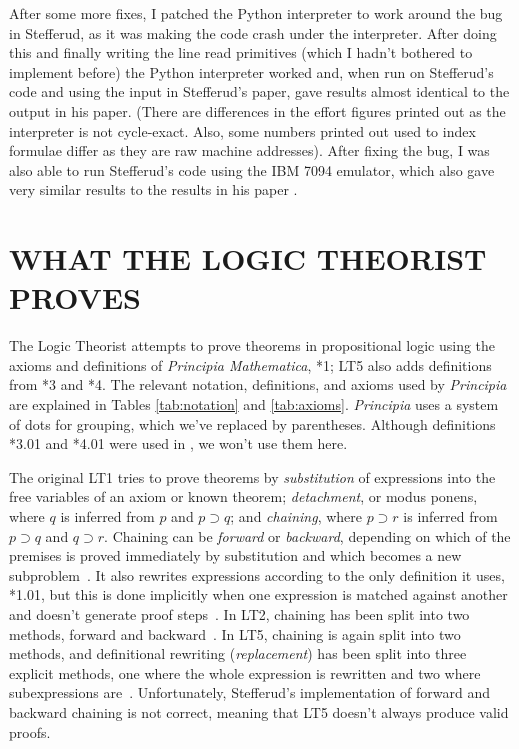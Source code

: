 \documentclass{IEEEcsmag}
\begin{document}
After some more fixes, I patched the Python interpreter to work
around the bug in Stefferud, as it was making the code crash under the
interpreter.  After doing this and finally writing the line read primitives
(which I hadn't bothered to implement before) the Python interpreter
worked and, when run on Stefferud's code and using the input in Stefferud's
paper, gave results almost identical to the output in his paper.
(There are differences in the effort figures printed out as the
interpreter is not cycle-exact. Also, some numbers printed out
used to index formulae differ as they are raw machine addresses).
After fixing the bug, I was also able to run Stefferud's code using
the IBM 7094 emulator, which also gave very similar results to the
results in his paper \cite{moewsrepo2}.

%
% 

\section{WHAT THE LOGIC THEORIST PROVES}
\label{sec:results}

The Logic Theorist attempts to prove theorems in propositional logic
using the axioms and definitions of \textit{Principia Mathematica}, 
*1; LT5 also adds definitions from *3 and 
*4.  The relevant notation, definitions, and axioms used by \textit{Principia}
are explained in Tables \ref{tab:notation} and \ref{tab:axioms}.
{\em Principia} uses a system of dots for grouping, which we've
replaced by parentheses.
Although definitions *3.01 and *4.01 were used in \cite{stefferud1963lt},
we won't use them here.

The original LT1 tries to prove theorems by {\em substitution}
of expressions into the free variables of an axiom or known
theorem; {\em detachment}, or modus ponens, where $q$ is inferred
from $p$ and $p\supset q$; and {\em chaining}, where $p\supset r$
is inferred from $p\supset q$ and $q\supset r$.  Chaining can
be {\em forward} or {\em backward}, depending on which of the
premises is proved immediately by substitution and which becomes
a new subproblem~\cite[pp.~29--45]{LT1956b}.
It also rewrites expressions according to the only definition
it uses, *1.01, but this is done implicitly when one expression
is matched against another and doesn't generate proof 
steps~\cite[p.~34]{LT1956b}.
In LT2, chaining has been split into two methods, forward
and backward~\cite[p.~222]{LT1957}.
In LT5, chaining is again split into two methods,
and definitional rewriting ({\em replacement})
has been split into three explicit methods, one where the whole
expression is rewritten and two where subexpressions 
are~\cite[Section~III]{stefferud1963lt}.
Unfortunately, Stefferud's implementation of forward and
backward chaining is not correct, meaning that LT5 doesn't
always produce valid proofs.
\end{document}
